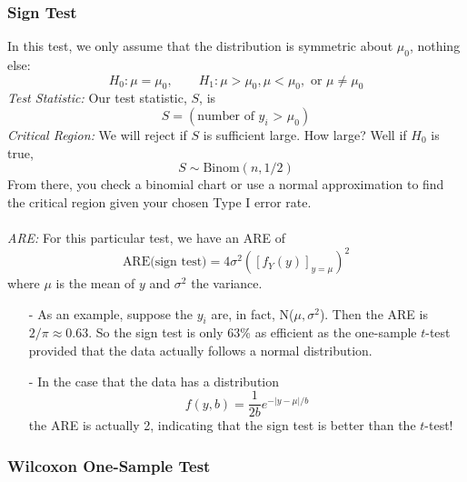 \documentclass[a4paper,12pt]{scrartcl}
\begin{document}
\subsubsection{Sign Test}

In this test, we only assume that the distribution is
symmetric about $\mu_0$, nothing else:
\[ H_0: \mu = \mu_0, \qquad H_1: \mu>\mu_0, \mu<\mu_0, \text{ or }
      \mu\neq\mu_0\]
{\sl Test Statistic:} Our test statistic, $S$, is
   \[ S = (\text{number of $y_i$ > $\mu_0$}) \]
{\sl Critical Region:} We will reject if $S$ is sufficient large.
How large? Well if $H_0$ is true,
   \[ S \sim \text{Binom}(n,1/2) \]
From there, you check a binomial chart or use a normal approximation
to find the critical region given your chosen Type I error rate.
\\
\\
{\sl ARE:} For this particular test, we have an ARE of
   \[ \text{ARE(sign test)} = 4\sigma^2 \left(\left[f_Y(y)\right]_{
      y=\mu} \right)^2 \]
where $\mu$ is the mean of $y$ and $\sigma^2$ the variance.
\begin{itemize}
   \item[-] As an
      example, suppose the $y_i$ are, in fact, N($\mu, \sigma^2$). Then
      the ARE is $2/\pi\approx 0.63$.  So the sign test is only 63\%
      as efficient as the one-sample $t$-test provided that the data
      actually follows a normal distribution.
   \item[-] In the case that the data has a distribution
      \[ f(y,b) = \frac{1}{2b} e^{-|y-\mu|/b} \]
      the ARE is actually 2, indicating that the sign test is better
      than the $t$-test!
\end{itemize}


\newpage
\subsubsection{Wilcoxon One-Sample Test}
\end{document}
